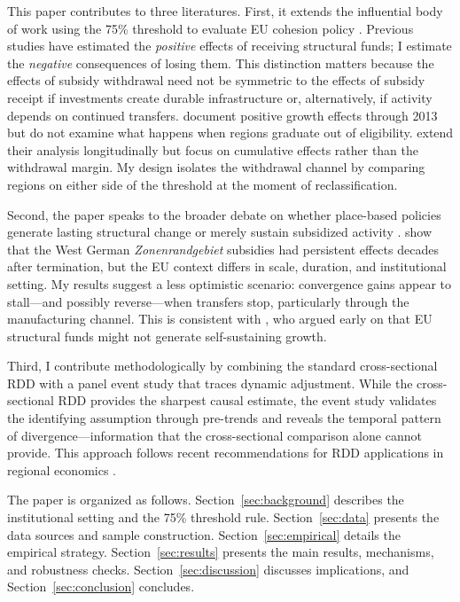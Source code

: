\documentclass[12pt]{article}
\begin{document}
This paper contributes to three literatures. First, it extends the influential body of work using the 75\% threshold to evaluate EU cohesion policy \citep{BeckerEggerVonEhrlich2010, BeckerEggerVonEhrlich2013, PellegriniTerribileTarolaMuccigrossoBusillo2013, Giua2017}. Previous studies have estimated the \emph{positive} effects of receiving structural funds; I estimate the \emph{negative} consequences of losing them. This distinction matters because the effects of subsidy withdrawal need not be symmetric to the effects of subsidy receipt if investments create durable infrastructure or, alternatively, if activity depends on continued transfers. \citet{BeckerEggerVonEhrlich2018} document positive growth effects through 2013 but do not examine what happens when regions graduate out of eligibility. \citet{BeckerEggerVonEhrlich2023} extend their analysis longitudinally but focus on cumulative effects rather than the withdrawal margin. My design isolates the withdrawal channel by comparing regions on either side of the threshold at the moment of reclassification.

Second, the paper speaks to the broader debate on whether place-based policies generate lasting structural change or merely sustain subsidized activity \citep{GlaeserGottlieb2008, KlineMoretti2014, CriscuoloMartinOvermanVanReenen2019}. \citet{GarciaMilaPonce2023} show that the West German \emph{Zonenrandgebiet} subsidies had persistent effects decades after termination, but the EU context differs in scale, duration, and institutional setting. My results suggest a less optimistic scenario: convergence gains appear to stall---and possibly reverse---when transfers stop, particularly through the manufacturing channel. This is consistent with \citet{BoldrinCanova2001}, who argued early on that EU structural funds might not generate self-sustaining growth.

Third, I contribute methodologically by combining the standard cross-sectional RDD with a panel event study that traces dynamic adjustment. While the cross-sectional RDD provides the sharpest causal estimate, the event study validates the identifying assumption through pre-trends and reveals the temporal pattern of divergence---information that the cross-sectional comparison alone cannot provide. This approach follows recent recommendations for RDD applications in regional economics \citep{CattaneoIdroboTitiunik2020, CalonicoCattaneoFarrell2020}.

The paper is organized as follows. Section~\ref{sec:background} describes the institutional setting and the 75\% threshold rule. Section~\ref{sec:data} presents the data sources and sample construction. Section~\ref{sec:empirical} details the empirical strategy. Section~\ref{sec:results} presents the main results, mechanisms, and robustness checks. Section~\ref{sec:discussion} discusses implications, and Section~\ref{sec:conclusion} concludes.
\end{document}
